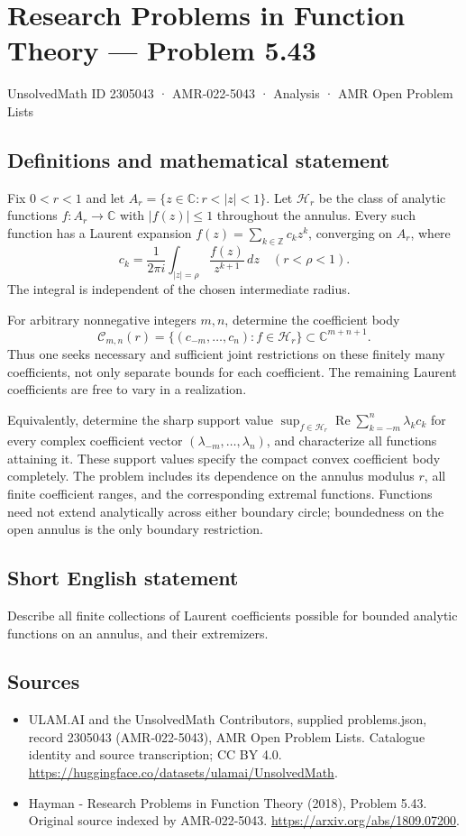 \documentclass[11pt,a4paper]{article}
\begin{document}
\section*{Research Problems in Function Theory — Problem 5.43}\label{2305043}
{\small UnsolvedMath ID 2305043 · AMR-022-5043 · Analysis · AMR Open Problem Lists}
\subsection{Definitions and mathematical statement}
Fix $0<r<1$ and let $A_r=\{z\in\mathbb C:r<|z|<1\}$.
Let $\mathcal H_r$ be the class of analytic functions
$f:A_r\to\mathbb C$ with $|f(z)|\leq1$ throughout the annulus.
Every such function has a Laurent expansion
$f(z)=\sum_{k\in\mathbb Z}c_kz^k$, converging on $A_r$, where
\[
 c_k=\frac1{2\pi i}\int_{|z|=\rho}
                      \frac{f(z)}{z^{k+1}}\,dz
 \quad(r<\rho<1).
\]
The integral is independent of the chosen intermediate radius.

For arbitrary nonnegative integers $m,n$, determine the coefficient
body
\[
 \mathcal C_{m,n}(r)=
       \{(c_{-m},\ldots,c_n):f\in\mathcal H_r\}
       \subset\mathbb C^{m+n+1}.
\]
Thus one seeks necessary and sufficient joint restrictions on
these finitely many coefficients, not only separate bounds for
each coefficient. The remaining Laurent coefficients are free
to vary in a realization.

Equivalently, determine the sharp support value
$\sup_{f\in\mathcal H_r}\operatorname{Re}
\sum_{k=-m}^{n}\lambda_kc_k$
for every complex coefficient vector $(\lambda_{-m},\ldots,\lambda_n)$,
and characterize all functions attaining it. These support values
specify the compact convex coefficient body completely. The
problem includes its dependence on the annulus modulus $r$,
all finite coefficient ranges, and the corresponding extremal
functions. Functions need not extend analytically across either
boundary circle; boundedness on the open annulus is the
only boundary restriction.
\subsection{Short English statement}
Describe all finite collections of Laurent coefficients possible for bounded analytic functions on an annulus, and their extremizers.
\subsection{Sources}
\begin{itemize}
\item[S1] ULAM.AI and the UnsolvedMath Contributors, supplied problems.json, record 2305043 (AMR-022-5043), AMR Open Problem Lists. Catalogue identity and source transcription; CC BY 4.0.
\url{https://huggingface.co/datasets/ulamai/UnsolvedMath}.
\item[S2] Hayman - Research Problems in Function Theory (2018), Problem 5.43. Original source indexed by AMR-022-5043.
\url{https://arxiv.org/abs/1809.07200}.
\end{itemize}
\end{document}
